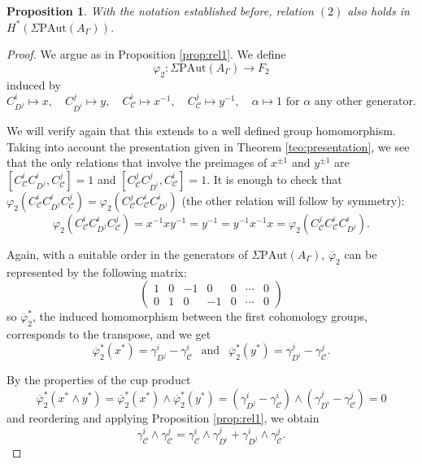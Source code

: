 \documentclass[a4paper]{amsart}
\newcommand{\G}{\Gamma}
\newcommand{\C}{\mathcal{C}}
\newcommand{\PAut}{\Sigma\mathrm{PAut}}
\newtheorem{prop}[teo]{Proposition}
\theoremstyle{definition}
\theoremstyle{remark}
\begin{document}
\begin{prop}
   With the notation established before, relation $(2)$ also holds in $H^*(\PAut(A_\G))$. \label{prop:rel2}
\end{prop}
\begin{proof}
    We argue as in Proposition \ref{prop:rel1}. We define 
    $$
\varphi_2: \PAut(A_\G) \rightarrow F_2
    $$
    induced by 
    $$
    C_{D^j}^i\mapsto x, \quad
   C_{D^i}^j\mapsto y, \quad
   C_{\mathcal{C}}^i\mapsto x^{-1}, \quad
   C_{\mathcal{C}}^j\mapsto y^{-1}, \quad
    \alpha\mapsto1 \textrm{ for } \alpha \textrm{ any other generator. } 
    $$

\noindent We will  verify again that this extends to a well defined group homomorphism. Taking into account  the presentation given in Theorem \ref{teo:presentation}, we see that the only relations that involve the preimages of $x^{\pm1}$ and $ y^{\pm1}$ are $[C_{\mathcal{C}}^iC_{D^j}^i, C_{\C}^j]=1$ and $[C_{\mathcal{C}}^jC_{D^i}^j, C_{\mathcal{C}}^i]=1$. It is enough to check that $\varphi_2(C_{\mathcal{C}}^iC_{D^j}^i C_{\mathcal{C}}^j)=\varphi_2(C_{\mathcal{C}}^jC_{\mathcal{C}}^iC_{D^j}^i )$ (the other relation will follow by symmetry):
$$
\varphi_2(C_{\mathcal{C}}^iC_{D^j}^i C_{\mathcal{C}}^j)=x^{-1}xy^{-1}=y^{-1}=y^{-1}x^{-1}x=\varphi_2(C_{\mathcal{C}}^jC_{\mathcal{C}}^iC_{D^j}^i ).
$$

\noindent Again, with a suitable order in the generators of $\PAut(A_\G)$, $\overline{\varphi}_2$ can be represented by the following matrix:
$$
\begin{pmatrix}
1 & 0 & -1 & 0 & 0&\cdots & 0 \\
0 & 1 & 0 & -1 & 0&\cdots & 0
\end{pmatrix}
$$
so  $\overline{\varphi}_2^*$, the induced  homomorphism between the first cohomology groups, corresponds to the transpose, and we get
$$\overline{\varphi}_2^*(x^*)=\gamma_{D^j}^i-\gamma_\C^i \ \ \textrm{ and }  \ \ \overline{\varphi}_2^*(y^*)=\gamma_{D^i}^j-\gamma_\C^j.$$



\noindent By the properties of the cup product  
$$
\overline{\varphi}_2^*(x^*\wedge y^*)=\overline{\varphi}_2^*(x^*)\wedge\overline{\varphi}_2^*(y^*)=(\gamma_{D^j}^i-\gamma_\C^i)\wedge (\gamma_{D^i}^j-\gamma_\C^j)=0
$$
and reordering and applying Proposition \ref{prop:rel1}, we obtain 
$$\gamma_{\mathcal{C}}^i\wedge \gamma_{\mathcal{C}}^j=\gamma_{\C}^i\wedge \gamma_{D^i}^j+ \gamma_{D^j}^i\wedge\gamma_{\mathcal{C}}^j.$$
\end{proof}
\end{document}
